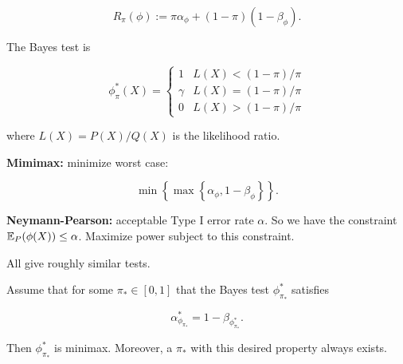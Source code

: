 \[
R_\pi(\phi) := \pi \alpha_\phi + (1 - \pi) (1 - \beta_\phi).
\]

The Bayes test is 

\[
\phi_\pi^*(X) = \begin{cases}
1 & L(X) < (1-\pi)/\pi \\
\gamma  & L(X) = (1- \pi)/\pi \\
0 & L(X) > (1 - \pi)/\pi
\end{cases}
\]

where \(L(X) = P(X)/Q(X)\) is the likelihood ratio.

\textbf{Mimimax:} minimize worst case:

\[
\min \left\{  \max \left\{\alpha_\phi, 1 - \beta_\phi \right\} \right\}.
\]

\textbf{Neymann-Pearson:} acceptable Type I error rate \(\alpha\). So we have the constraint \(\E_P(\phi(X)) \leq \alpha\). Maximize power subject to this constraint.

All give roughly similar tests. 

\begin{theorem}

Assume that for some \(\pi_* \in [0,1]\) that the Bayes test \(\phi_{\pi_*}^*\) satisfies 

\begin{equation}\label{mathstats.541b.minimax.thm}
\alpha_{\phi_{\pi_*}}^* = 1 - \beta_{\phi_{\pi_*}^*}.
\end{equation}

Then \(\phi_{\pi_*}^*\) is minimax. Moreover, a \(\pi_*\) with this desired property always exists.

\end{theorem}

